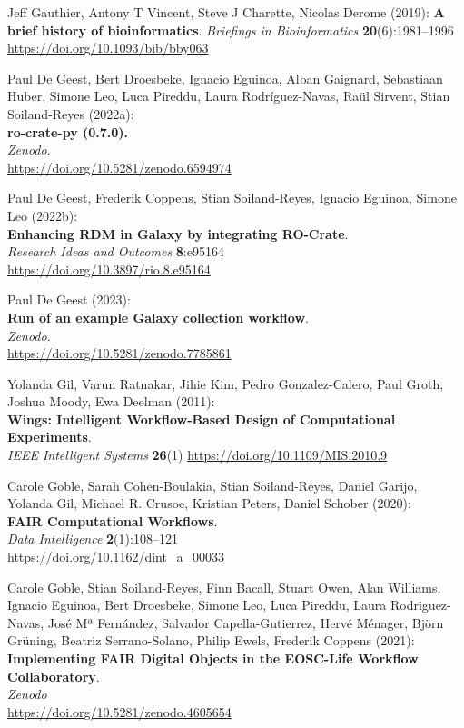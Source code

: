 \documentclass[10pt,letterpaper]{article}
\begin{document}
\begin{thebibliography}{10}
\begin{small}
Jeff Gauthier, Antony T Vincent, Steve J Charette, Nicolas Derome (2019):
\textbf{A brief history of bioinformatics}.
\emph{Briefings in Bioinformatics} \textbf{20}(6):1981–1996
\url{https://doi.org/10.1093/bib/bby063}

Paul De Geest, Bert Droesbeke, Ignacio Eguinoa,
Alban Gaignard, Sebastiaan Huber, Simone Leo, Luca Pireddu,
Laura Rodríguez-Navas, Raül Sirvent, Stian Soiland-Reyes (2022a):\\
\textbf{ro-crate-py (0.7.0).}\\
\emph{Zenodo}.\\
\url{https://doi.org/10.5281/zenodo.6594974}

 Paul De Geest, Frederik Coppens, Stian Soiland-Reyes, Ignacio Eguinoa, Simone Leo (2022b):\\
\textbf{Enhancing RDM in Galaxy by integrating RO-Crate}.\\
\emph{Research Ideas and Outcomes} \textbf{8}:e95164\\
\url{https://doi.org/10.3897/rio.8.e95164}

Paul De Geest (2023):\\
\textbf{Run of an example Galaxy collection workflow}.\\
\emph{Zenodo}.\\
\url{https://doi.org/10.5281/zenodo.7785861}

Yolanda Gil, Varun Ratnakar, Jihie Kim, Pedro Gonzalez-Calero, Paul Groth, Joshua Moody, Ewa Deelman (2011):\\
\textbf{Wings: Intelligent Workflow-Based Design of Computational Experiments}.\\
\emph{IEEE Intelligent Systems} \textbf{26}(1)
\url{https://doi.org/10.1109/MIS.2010.9}

Carole Goble, Sarah Cohen-Boulakia, Stian Soiland-Reyes, Daniel Garijo, Yolanda Gil, Michael R. Crusoe, Kristian Peters, Daniel Schober (2020):\\
\textbf{FAIR Computational Workflows}.\\
\emph{Data Intelligence} \textbf{2}(1):108--121\\
\url{https://doi.org/10.1162/dint_a_00033}

Carole Goble, Stian Soiland-Reyes, Finn Bacall, Stuart Owen, Alan Williams, Ignacio Eguinoa, Bert Droesbeke, Simone Leo, Luca Pireddu, Laura Rodriguez-Navas, José Mª Fernández, Salvador Capella-Gutierrez, Hervé Ménager, Björn Grüning, Beatriz Serrano-Solano, Philip Ewels, Frederik Coppens (2021):\\
\textbf{Implementing FAIR Digital Objects in the EOSC-Life Workflow Collaboratory}.\\
\emph{Zenodo}\\
\url{https://doi.org/10.5281/zenodo.4605654}


\end{small}
\end{thebibliography}
\end{document}
